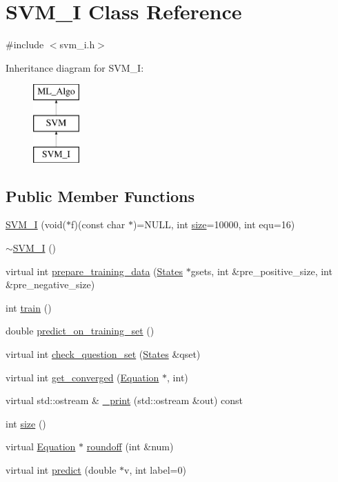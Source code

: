 \hypertarget{classSVM__I}{}\section{S\+V\+M\+\_\+I Class Reference}
\label{classSVM__I}


{\ttfamily \#include $<$svm\+\_\+i.\+h$>$}

Inheritance diagram for S\+V\+M\+\_\+I\+:\begin{figure}[H]
\begin{center}
\leavevmode
\includegraphics[height=3.000000cm]{classSVM__I}
\end{center}
\end{figure}
\subsection*{Public Member Functions}
\begin{DoxyCompactItemize}
\item 
\hyperlink{classSVM__I_aa7843beb94a2df684a5c8874322341c2}{S\+V\+M\+\_\+I} (void($\ast$f)(const char $\ast$)=N\+U\+LL, int \hyperlink{classSVM__I_a1b66cefe313cffaa77d4271dfb4b8474}{size}=10000, int equ=16)
\item 
\hyperlink{classSVM__I_a72cef53f36557c007f36a03724a62fb8}{$\sim$\+S\+V\+M\+\_\+I} ()
\item 
virtual int \hyperlink{classSVM__I_ab0236699daa4967cfec71234faa785c5}{prepare\+\_\+training\+\_\+data} (\hyperlink{classStates}{States} $\ast$gsets, int \&pre\+\_\+positive\+\_\+size, int \&pre\+\_\+negative\+\_\+size)
\item 
int \hyperlink{classSVM__I_abf732821c264b2cb8bef5d252991f2b6}{train} ()
\item 
double \hyperlink{classSVM__I_a643c2a6e58f8e70ab276ade9b1873bf6}{predict\+\_\+on\+\_\+training\+\_\+set} ()
\item 
virtual int \hyperlink{classSVM__I_a84470dce77add6377454c4408c6c1466}{check\+\_\+question\+\_\+set} (\hyperlink{classStates}{States} \&qset)
\item 
virtual int \hyperlink{classSVM__I_a5d1a8c93d41597aea5f31689687dbc77}{get\+\_\+converged} (\hyperlink{classEquation}{Equation} $\ast$, int)
\item 
virtual std\+::ostream \& \hyperlink{classSVM__I_ab0ae30d86d9f9026908a7b902f7a78e3}{\+\_\+print} (std\+::ostream \&out) const 
\item 
int \hyperlink{classSVM__I_a1b66cefe313cffaa77d4271dfb4b8474}{size} ()
\item 
virtual \hyperlink{classEquation}{Equation} $\ast$ \hyperlink{classSVM__I_a91b713ef0810fd4c83a5c711aea9fecf}{roundoff} (int \&num)
\item 
virtual int \hyperlink{classSVM__I_abe0a76aa6d31d18c2ee66002c35c813f}{predict} (double $\ast$v, int label=0)
\end{DoxyCompactItemize}
